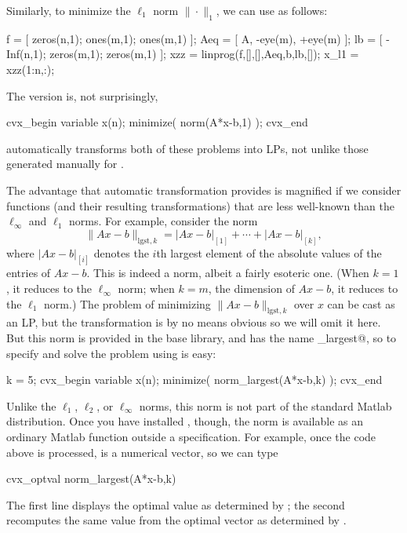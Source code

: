 \documentclass[12pt]{article}
\begin{document}
Similarly, to minimize the $\ell_1$ norm $\|\cdot\|_1$, we can
use \verb@linprog@ as follows:
\begin{code2}[firstnumber=140]
	f    = [ zeros(n,1); ones(m,1);  ones(m,1)  ];
	Aeq  = [ A,          -eye(m),    +eye(m)    ];
	lb   = [ -Inf(n,1);  zeros(m,1); zeros(m,1) ];
	xzz  = linprog(f,[],[],Aeq,b,lb,[]);
	x_l1 = xzz(1:n,:);
\end{code2}
The \cvx version is, not surprisingly,
\begin{code2}[firstnumber=150]
	cvx_begin
	    variable x(n);
	    minimize( norm(A*x-b,1) );
	cvx_end
\end{code2}
\cvx automatically transforms both of these problems into LPs, not unlike
those generated manually for \verb@linprog@.

The advantage that automatic transformation provides
is magnified if we consider
functions (and their resulting transformations) that are less well-known than 
the $\ell_\infty$ and $\ell_1$ norms. For example, consider
the norm
\[
\| Ax-b\|_{\mathrm{lgst},k} = |Ax-b|_{[1]}+ \cdots + |Ax-b|_{[k]},
\]
where $|Ax-b|_{[i]}$ denotes the $i$th largest element of the absolute
values of the entries of $Ax-b$.
This is indeed a norm, albeit a fairly esoteric one.
(When $k=1$, it reduces to the $\ell_\infty$ norm;
when $k=m$, the dimension of $Ax-b$, it reduces to the $\ell_1$ norm.)
The problem of minimizing $\| Ax-b\|_{\mathrm{lgst},k}$ over $x$
can be cast as an LP, but the transformation is by no means obvious
so we will omit it here.
But this norm is provided in the base \cvx library, and has the name
\verb@norm_largest@, so to specify and solve
the problem using \cvx is easy:
\begin{code2}[firstnumber=180]
	k = 5;
	cvx_begin
	    variable x(n);
	    minimize( norm_largest(A*x-b,k) );
	cvx_end
\end{code2}
Unlike the $\ell_1$, $\ell_2$, or $\ell_\infty$ norms,
this norm is not part of the standard Matlab distribution.
Once you have installed \cvx, though, the norm is available as 
an ordinary Matlab function outside a \cvx specification.
For example, once the code above is processed, \verb@x@ is
a numerical vector, so we can type
\begin{code}
	cvx_optval
	norm_largest(A*x-b,k)
\end{code}
The first line displays the optimal value as determined by \cvx;
the second recomputes the same value from the optimal
vector \verb@x@ as determined by \cvx.
\end{document}
